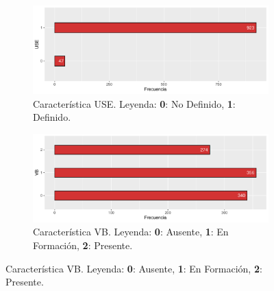 \begin{figure}[p]

    \begin{subfigure}{\textwidth}
        \includegraphics[width=\linewidth]{../../scripts/eda/eda_univar/char_use_distr.pdf}
        \caption{Característica USE. Leyenda: \textbf{0}: No Definido, \textbf{1}: Definido.}
        \label{fig4:todd_chars__use}
    \end{subfigure}

    \begin{subfigure}{\textwidth}
        \includegraphics[width=\linewidth]{../../scripts/eda/eda_univar/char_vb_distr.pdf}
        \caption{Característica VB. Leyenda: \textbf{0}: Ausente, \textbf{1}: En Formación, \textbf{2}: Presente.}
        \label{fig4:todd_chars__vb}
    \end{subfigure}


\end{figure}

